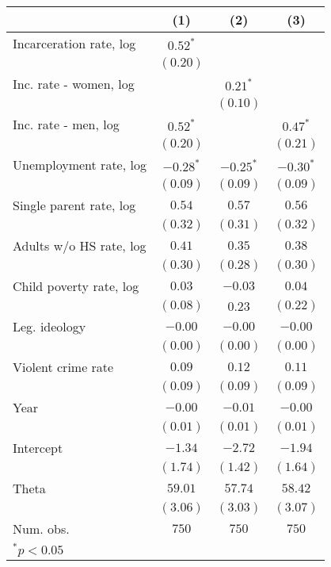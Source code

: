 
\begin{table}
\tiny
\begin{center}
\label{CL-FE}
\begin{tabular}{l c c c}
\hline
&(1)&(2)&(3)\\
\hline
Incarceration rate, log     & $0.52^{*}$  &                &\\
                            & $(0.20)$    &                &\\
Inc. rate - women, log      &             &$0.21^{*}$      &\\
                            &             & $(0.10)$       &\\
Inc. rate - men, log        & $0.52^{*}$  &                &$0.47^{*}$\\
                            & $(0.20)$    &                &$(0.21)$\\
Unemployment rate, log      & $-0.28^{*}$ &$-0.25^{*}$     &$-0.30^{*}$\\
                            & $(0.09)$    & $(0.09)$       &$(0.09)$\\
Single parent rate, log     & $0.54$      & $0.57$         &$0.56$\\
                            & $(0.32)$    & $(0.31)$       &$(0.32)$\\
Adults w/o HS rate, log     & $0.41$      & $0.35$         &$0.38$\\
                            & $(0.30)$    & $(0.28)$       &$(0.30)$\\
Child poverty rate, log     & $0.03$      &  $-0.03$       &$0.04$\\
                            & $(0.08)$    &  $0.23$        &$(0.22)$\\
Leg. ideology               & $-0.00$     & $-0.00$        &$-0.00$\\
                            & $(0.00)$    & $(0.00)$       &$(0.00)$\\
Violent crime rate          & $0.09$      & $0.12$         &$0.11$\\
                            & $(0.09)$    & $(0.09)$       &$(0.09)$\\
Year                        & $-0.00$     & $-0.01$        &$-0.00$\\
                            & $(0.01)$    & $(0.01)$       &$(0.01)$\\
Intercept                   & $-1.34$     & $-2.72$        &$-1.94$\\
                            & $(1.74)$      & $(1.42)$       &$(1.64)$\\
Theta                       & $59.01$     & $57.74$        &$58.42$\\
                            & $(3.06)$      & $(3.03)$       &$(3.07)$\\
\hline
Num. obs.                   & $750$         & $750$          &$750$\\
\hline
\multicolumn{3}{l}{\scriptsize{$^*p<0.05$}}
\end{tabular}
\end{center}
\end{table}
